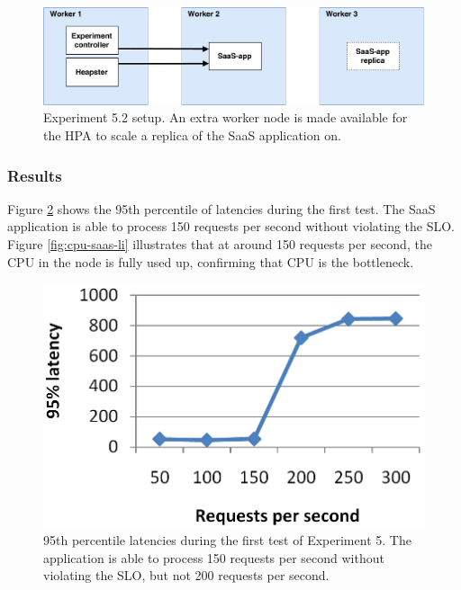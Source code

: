 \begin{figure}
\centering
\includegraphics[width=0.9\columnwidth]{Images/Experiments/Experiment_3_SaaS.pdf}
\caption{Experiment 5.2 setup. An extra worker node is made available for the HPA to scale a replica of the SaaS application on.}
\label{fig:experiment5.2}
\end{figure}


\subsubsection{Results}
Figure \ref{fig:lat-saas-li} shows the 95th percentile of latencies during the first test. The SaaS application is able to process 150 requests per second without violating the SLO. Figure \ref{fig:cpu-saas-li} illustrates that at around 150 requests per second, the CPU in the node is fully used up, confirming that CPU is the bottleneck. 

\begin{figure}
\centering
\includegraphics[width=0.80\columnwidth]{Images/Experiments/CPU/Latencies/lat-saas-li.PNG}
\caption{95th percentile latencies during the first test of Experiment 5. The application is able to process 150 requests per second without violating the SLO, but not 200 requests per second.}
\label{fig:lat-saas-li}
\end{figure}


